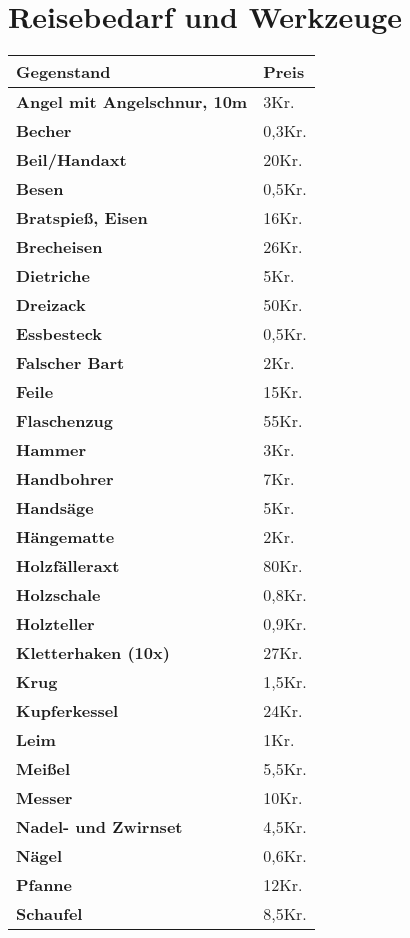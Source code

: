 \section{Reisebedarf und Werkzeuge}
\begin{longtable}{|p{5cm}|p{2cm}|}
\hline
\textbf{Gegenstand} & \textbf{Preis} \\ \hline
\textbf{Angel mit Angelschnur, 10m} & 3Kr. \\ \hline
\textbf{Becher} & 0,3Kr. \\ \hline
\textbf{Beil/Handaxt} & 20Kr. \\ \hline
\textbf{Besen} & 0,5Kr. \\ \hline
\textbf{Bratspieß, Eisen} & 16Kr. \\ \hline
\textbf{Brecheisen} & 26Kr. \\ \hline
\textbf{Dietriche} & 5Kr. \\ \hline
\textbf{Dreizack} & 50Kr. \\ \hline
\textbf{Essbesteck} & 0,5Kr. \\ \hline
\textbf{Falscher Bart} & 2Kr. \\ \hline
\textbf{Feile} & 15Kr. \\ \hline
\textbf{Flaschenzug} & 55Kr. \\ \hline
\textbf{Hammer} & 3Kr. \\ \hline
\textbf{Handbohrer} & 7Kr. \\ \hline
\textbf{Handsäge} & 5Kr. \\ \hline
\textbf{Hängematte} & 2Kr. \\ \hline
\textbf{Holzfälleraxt} & 80Kr. \\ \hline
\textbf{Holzschale} & 0,8Kr. \\ \hline
\textbf{Holzteller} & 0,9Kr. \\ \hline
\textbf{Kletterhaken (10x)} & 27Kr. \\ \hline
\textbf{Krug} & 1,5Kr. \\ \hline
\textbf{Kupferkessel} & 24Kr. \\ \hline
\textbf{Leim} & 1Kr. \\ \hline
\textbf{Meißel} & 5,5Kr. \\ \hline
\textbf{Messer} & 10Kr. \\ \hline
\textbf{Nadel- und Zwirnset} & 4,5Kr. \\ \hline
\textbf{Nägel} & 0,6Kr. \\ \hline
\textbf{Pfanne} & 12Kr. \\ \hline
\textbf{Schaufel} & 8,5Kr. \\ \hline

\end{longtable}
